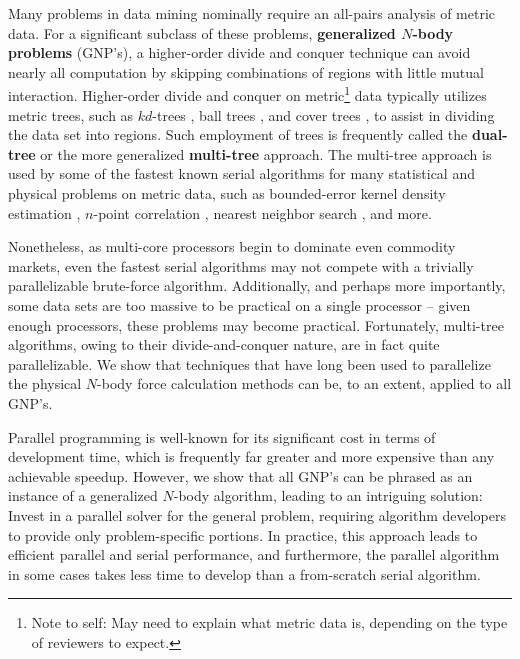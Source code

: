 \documentclass[twoside,leqno,twocolumn]{article}
\newcommand{\THOR}{{{\tt THOR}} }
\newcommand{\authornote}[1]{\footnote{Note to self: #1}}
\newcommand{\authorsnote}[1]{\authornote{#1}}
\newcommand{\defterm}[1]{{\bf #1}}
\begin{document}
Many problems in data mining nominally require an all-pairs analysis of metric data.
For a significant subclass of these problems, \defterm{generalized $N$-body problems} (GNP's), a higher-order divide and conquer technique can avoid nearly all computation by skipping combinations of regions with little mutual interaction.
Higher-order divide and conquer on metric\authorsnote{May need to explain what metric data is, depending on the type of reviewers to expect.} data typically utilizes metric trees, such as $kd$-trees \cite{preparata_kdtrees}, ball trees \cite{balltrees}, and cover trees \cite{covertrees}, to assist in dividing the data set into regions.
Such employment of trees is frequently called the \defterm{dual-tree} or the more generalized \defterm{multi-tree} approach.
The multi-tree approach is used by some of the fastest known serial algorithms for many statistical and physical problems on metric data, such as bounded-error kernel density estimation \cite{gray_kde, lee_gauss1, lee_gauss2}, $n$-point correlation \cite{gray_nbody}, nearest neighbor search \cite{ryan_nips}, and more.

Nonetheless, as multi-core processors begin to dominate even commodity markets, even the fastest serial algorithms may not compete with a trivially parallelizable brute-force algorithm.
Additionally, and perhaps more importantly, some data sets are too massive to be practical on a single processor -- given enough processors, these problems may become practical.
Fortunately, multi-tree algorithms, owing to their divide-and-conquer nature, are in fact quite parallelizable.
We show that techniques that have long been used to parallelize the physical $N$-body force calculation methods can be, to an extent, applied to all GNP's.

Parallel programming is well-known for its significant cost in terms of development time, which is frequently far greater and more expensive than any achievable speedup.
However, we show that all GNP's can be phrased as an instance of a generalized $N$-body algorithm, leading to an intriguing solution: Invest in a parallel solver for the general problem, requiring algorithm developers to provide only problem-specific portions.
In practice, this approach leads to efficient parallel and serial performance, and furthermore, the parallel algorithm in some cases takes less time to develop than a from-scratch serial algorithm.

\end{document}
